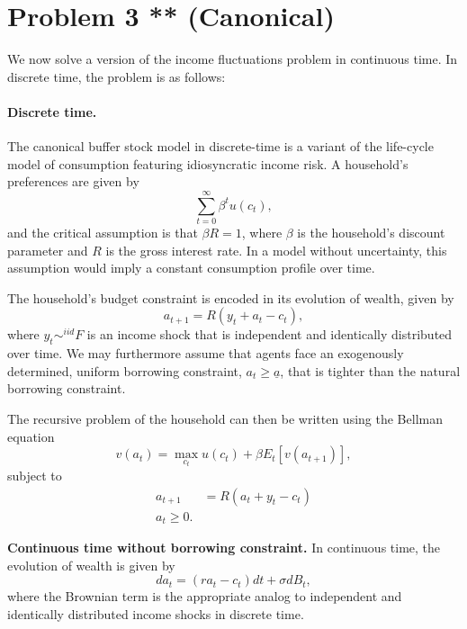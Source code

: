 \documentclass[11pt]{extarticle}
\theoremstyle{plain}
\theoremstyle{definition}
\begin{document}
\vspace{10mm}
\section*{Problem 3 ** (Canonical)}

We now solve a version of the income fluctuations problem in continuous time. In discrete time, the problem is as follows:


\paragraph{Discrete time.} The canonical buffer stock model in discrete-time is a variant of the life-cycle model of consumption featuring idiosyncratic income risk. A household's preferences are given by 
\begin{equation}
	\sum_{t=0}^\infty \beta^t u(c_t),
\end{equation}
and the critical assumption is that $\beta R = 1$, where $\beta$ is the household's discount parameter and $R$ is the gross interest rate. In a model without uncertainty, this assumption would imply a constant consumption profile over time.

The household's budget constraint is encoded in its evolution of wealth, given by 
\begin{equation}
	a_{t+1} = R(y_t + a_t - c_t),
\end{equation}
where $y_t \sim^{iid} F$ is an income shock that is independent and identically distributed over time. We may furthermore assume that agents face an exogenously determined, uniform borrowing constraint, $a_t \geq \underline{a}$, that is tighter than the natural borrowing constraint. 

The recursive problem of the household can then be written using the Bellman equation
\begin{equation}
	v(a_t) = \max_{c_t} u(c_t) + \beta E_t[v(a_{t+1})],
\end{equation}
subject to 
\begin{align*}
	a_{t+1} &= R(a_t + y_t - c_t) \\
	a_{t} \geq 0.
\end{align*}


\vspace{5mm}
\noindent
\textbf{Continuous time without borrowing constraint.} In continuous time, the evolution of wealth is given by 
\begin{equation}
	da_t = (ra_t - c_t) dt + \sigma dB_t,
\end{equation}
where the Brownian term is the appropriate analog to independent and identically distributed income shocks in discrete time. 
\end{document}

